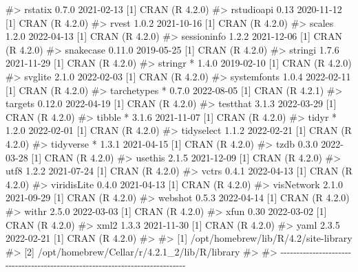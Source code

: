 \documentclass[
  11pt,
  letterpaper,
  DIV=11,
  numbers=noendperiod]{scrartcl}
\newenvironment{Shaded}{}{}
\newcommand{\CommentTok}[1]{\textcolor[rgb]{0.42,0.45,0.49}{#1}}
\begin{document}
\begin{Shaded}
\begin{Highlighting}[]
\CommentTok{\#\textgreater{}  rstatix       0.7.0     2021{-}02{-}13 [1] CRAN (R 4.2.0)}
\CommentTok{\#\textgreater{}  rstudioapi    0.13      2020{-}11{-}12 [1] CRAN (R 4.2.0)}
\CommentTok{\#\textgreater{}  rvest         1.0.2     2021{-}10{-}16 [1] CRAN (R 4.2.0)}
\CommentTok{\#\textgreater{}  scales        1.2.0     2022{-}04{-}13 [1] CRAN (R 4.2.0)}
\CommentTok{\#\textgreater{}  sessioninfo   1.2.2     2021{-}12{-}06 [1] CRAN (R 4.2.0)}
\CommentTok{\#\textgreater{}  snakecase     0.11.0    2019{-}05{-}25 [1] CRAN (R 4.2.0)}
\CommentTok{\#\textgreater{}  stringi       1.7.6     2021{-}11{-}29 [1] CRAN (R 4.2.0)}
\CommentTok{\#\textgreater{}  stringr     * 1.4.0     2019{-}02{-}10 [1] CRAN (R 4.2.0)}
\CommentTok{\#\textgreater{}  svglite       2.1.0     2022{-}02{-}03 [1] CRAN (R 4.2.0)}
\CommentTok{\#\textgreater{}  systemfonts   1.0.4     2022{-}02{-}11 [1] CRAN (R 4.2.0)}
\CommentTok{\#\textgreater{}  tarchetypes * 0.7.0     2022{-}08{-}05 [1] CRAN (R 4.2.1)}
\CommentTok{\#\textgreater{}  targets       0.12.0    2022{-}04{-}19 [1] CRAN (R 4.2.0)}
\CommentTok{\#\textgreater{}  testthat      3.1.3     2022{-}03{-}29 [1] CRAN (R 4.2.0)}
\CommentTok{\#\textgreater{}  tibble      * 3.1.6     2021{-}11{-}07 [1] CRAN (R 4.2.0)}
\CommentTok{\#\textgreater{}  tidyr       * 1.2.0     2022{-}02{-}01 [1] CRAN (R 4.2.0)}
\CommentTok{\#\textgreater{}  tidyselect    1.1.2     2022{-}02{-}21 [1] CRAN (R 4.2.0)}
\CommentTok{\#\textgreater{}  tidyverse   * 1.3.1     2021{-}04{-}15 [1] CRAN (R 4.2.0)}
\CommentTok{\#\textgreater{}  tzdb          0.3.0     2022{-}03{-}28 [1] CRAN (R 4.2.0)}
\CommentTok{\#\textgreater{}  usethis       2.1.5     2021{-}12{-}09 [1] CRAN (R 4.2.0)}
\CommentTok{\#\textgreater{}  utf8          1.2.2     2021{-}07{-}24 [1] CRAN (R 4.2.0)}
\CommentTok{\#\textgreater{}  vctrs         0.4.1     2022{-}04{-}13 [1] CRAN (R 4.2.0)}
\CommentTok{\#\textgreater{}  viridisLite   0.4.0     2021{-}04{-}13 [1] CRAN (R 4.2.0)}
\CommentTok{\#\textgreater{}  visNetwork    2.1.0     2021{-}09{-}29 [1] CRAN (R 4.2.0)}
\CommentTok{\#\textgreater{}  webshot       0.5.3     2022{-}04{-}14 [1] CRAN (R 4.2.0)}
\CommentTok{\#\textgreater{}  withr         2.5.0     2022{-}03{-}03 [1] CRAN (R 4.2.0)}
\CommentTok{\#\textgreater{}  xfun          0.30      2022{-}03{-}02 [1] CRAN (R 4.2.0)}
\CommentTok{\#\textgreater{}  xml2          1.3.3     2021{-}11{-}30 [1] CRAN (R 4.2.0)}
\CommentTok{\#\textgreater{}  yaml          2.3.5     2022{-}02{-}21 [1] CRAN (R 4.2.0)}
\CommentTok{\#\textgreater{} }
\CommentTok{\#\textgreater{}  [1] /opt/homebrew/lib/R/4.2/site{-}library}
\CommentTok{\#\textgreater{}  [2] /opt/homebrew/Cellar/r/4.2.1\_2/lib/R/library}
\CommentTok{\#\textgreater{} }
\CommentTok{\#\textgreater{} {-}{-}{-}{-}{-}{-}{-}{-}{-}{-}{-}{-}{-}{-}{-}{-}{-}{-}{-}{-}{-}{-}{-}{-}{-}{-}{-}{-}{-}{-}{-}{-}{-}{-}{-}{-}{-}{-}{-}{-}{-}{-}{-}{-}{-}{-}{-}{-}{-}{-}{-}{-}{-}{-}{-}{-}{-}{-}{-}{-}{-}{-}{-}{-}{-}{-}{-}{-}{-}{-}{-}{-}{-}{-}{-}{-}{-}{-}}
\end{Highlighting}
\end{Shaded}
\end{document}
